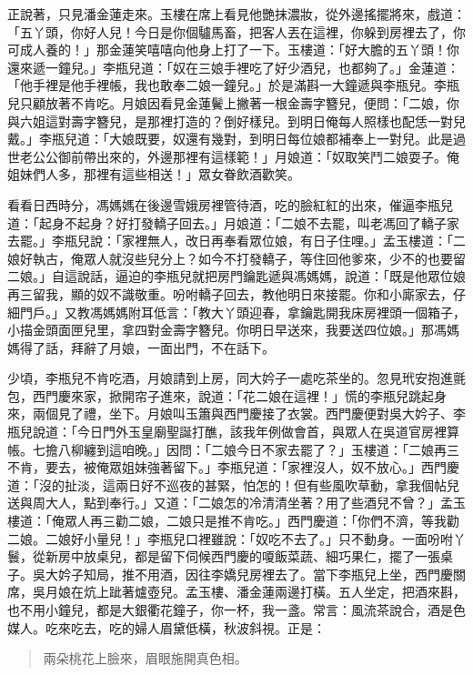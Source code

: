 正說著，只見潘金蓮走來。玉樓在席上看見他艷抹濃妝，從外邊搖擺將來，戲道：「五丫頭，你好人兒！今日是你個驢馬畜，把客人丟在這裡，你躲到房裡去了，你可成人養的！」那金蓮笑嘻嘻向他身上打了一下。玉樓道：「好大膽的五丫頭！你還來遞一鐘兒。」李瓶兒道：「奴在三娘手裡吃了好少酒兒，也都夠了。」金蓮道：「他手裡是他手裡帳，我也敢奉二娘一鐘兒。」於是滿斟一大鐘遞與李瓶兒。李瓶兒只顧放著不肯吃。月娘因看見金蓮鬢上撇著一根金壽字簪兒，便問：「二娘，你與六姐這對壽字簪兒，是那裡打造的？倒好樣兒。到明日俺每人照樣也配恁一對兒戴。」李瓶兒道：「大娘既要，奴還有幾對，到明日每位娘都補奉上一對兒。此是過世老公公御前帶出來的，外邊那裡有這樣範！」月娘道：「奴取笑鬥二娘耍子。俺姐妹們人多，那裡有這些相送！」眾女眷飲酒歡笑。

看看日西時分，馮媽媽在後邊雪娥房裡管待酒，吃的臉紅紅的出來，催逼李瓶兒道：「起身不起身？好打發轎子回去。」月娘道：「二娘不去罷，叫老馮回了轎子家去罷。」李瓶兒說：「家裡無人，改日再奉看眾位娘，有日子住哩。」孟玉樓道：「二娘好執古，俺眾人就沒些兒分上？如今不打發轎子，等住回他爹來，少不的也要留二娘。」自這說話，逼迫的李瓶兒就把房門鑰匙遞與馮媽媽，說道：「既是他眾位娘再三留我，顯的奴不識敬重。吩咐轎子回去，教他明日來接罷。你和小廝家去，仔細門戶。」又教馮媽媽附耳低言：「教大丫頭迎春，拿鑰匙開我床房裡頭一個箱子，小描金頭面匣兒里，拿四對金壽字簪兒。你明日早送來，我要送四位娘。」那馮媽媽得了話，拜辭了月娘，一面出門，不在話下。

少頃，李瓶兒不肯吃酒，月娘請到上房，同大妗子一處吃茶坐的。忽見玳安抱進氈包，西門慶來家，掀開帘子進來，說道：「花二娘在這裡！」慌的李瓶兒跳起身來，兩個見了禮，坐下。月娘叫玉簫與西門慶接了衣裳。西門慶便對吳大妗子、李瓶兒說道：「今日門外玉皇廟聖誕打醮，該我年例做會首，與眾人在吳道官房裡算帳。七擔八柳纏到這咱晚。」因問：「二娘今日不家去罷了？」玉樓道：「二娘再三不肯，要去，被俺眾姐妹強著留下。」李瓶兒道：「家裡沒人，奴不放心。」西門慶道：「沒的扯淡，這兩日好不巡夜的甚緊，怕怎的！但有些風吹草動，拿我個帖兒送與周大人，點到奉行。」又道：「二娘怎的冷清清坐著？用了些酒兒不曾？」孟玉樓道：「俺眾人再三勸二娘，二娘只是推不肯吃。」西門慶道：「你們不濟，等我勸二娘。二娘好小量兒！」李瓶兒口裡雖說：「奴吃不去了。」只不動身。一面吩咐丫鬟，從新房中放桌兒，都是留下伺候西門慶的嗄飯菜蔬、細巧果仁，擺了一張桌子。吳大妗子知局，推不用酒，因往李嬌兒房裡去了。當下李瓶兒上坐，西門慶關席，吳月娘在炕上跐著爐壺兒。孟玉樓、潘金蓮兩邊打橫。五人坐定，把酒來斟，也不用小鐘兒，都是大銀衢花鐘子，你一杯，我一盞。常言：風流茶說合，酒是色媒人。吃來吃去，吃的婦人眉黛低橫，秋波斜視。正是：
\begin{quote}
兩朵桃花上臉來，眉眼施開真色相。
\end{quote}

